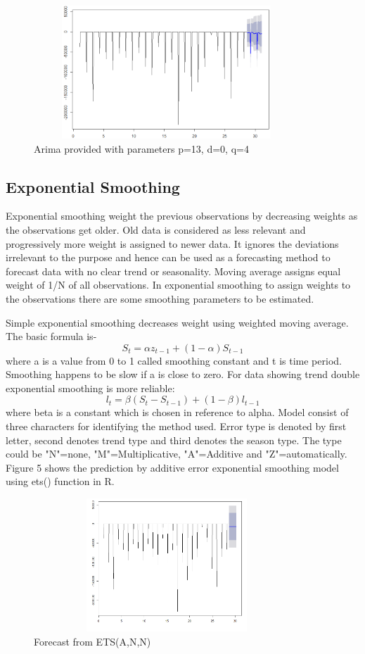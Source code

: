 \documentclass[runningheads]{llncs}
\begin{document}
\begin{figure}
\centering
\includegraphics[scale=1,width=10cm,height=5cm]{Arima!AutoNew.png} 
\caption{Arima provided with parameters p=13, d=0, q=4}
\end{figure}

\subsection{Exponential Smoothing}
Exponential smoothing weight the previous observations by decreasing weights as the observations get older. Old data is considered as less relevant and progressively more weight is assigned to newer data. It ignores the deviations irrelevant to the purpose and hence can be used as a forecasting method to forecast data with no clear trend or seasonality. Moving average assigns equal weight of 1/N of all observations. In exponential smoothing to assign weights  to the observations there are some smoothing parameters to be estimated.

Simple exponential smoothing decreases weight using weighted moving average. The basic formula is-
\begin{equation}
  S_{t} = {\alpha}z_{t-1} + (1-{\alpha})S_{t-1}
\end{equation}
where a is a value from 0 to 1 called smoothing constant and t is time period. Smoothing happens to be slow if a is close to zero. For data showing trend double exponential smoothing is more reliable:
\begin{equation}
  l_{t} = {\beta}(S_{t} - S_{t-1}) + (1 - {\beta})l_{t-1}
\end{equation}
where beta is a constant which is chosen in reference to alpha.
Model consist of three characters for identifying the method used.
Error type is denoted by first letter, second denotes trend type and third denotes the season type. The type could be "N"=none, "M"=Multiplicative, "A"=Additive and "Z"=automatically.
Figure 5 shows the prediction by additive error exponential smoothing model using ets() function in R.
\begin{figure}
\centering
\includegraphics[scale=1,width=10cm,height=5cm]{ets.png} 
\caption{Forecast from ETS(A,N,N)}
\end{figure}
\end{document}
